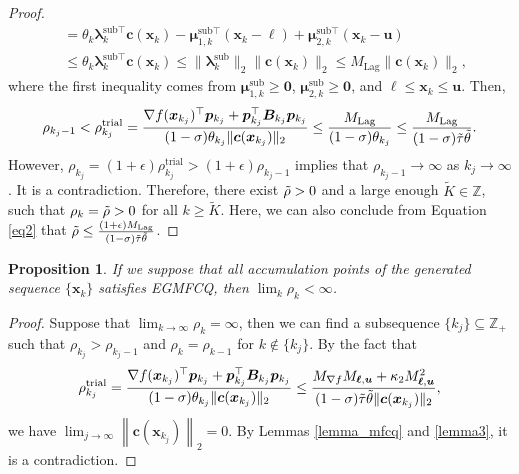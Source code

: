 \documentclass[aos]{imsart}
\numberwithin{equation}{section}
\theoremstyle{plain}
\newtheorem{proposition}{Proposition}
\begin{document}
\begin{appendix}
\begin{proof}
\begin{equation*}
\begin{split}
        & = \theta_k \bm{\lambda}_k^{\text{sub} \top} \bm{c}(\bm{x}_{k}) - \bm{\mu}_{1,k}^{\text{sub} \top}(\bm{x}_k  - \bm{\ell}) + \bm{\mu}_{2,k}^{\text{sub} \top}(\bm{x}_k  - \bm{u})\\
        & \leq \theta_k \bm{\lambda}_k^{\text{sub} \top} \bm{c}(\bm{x}_{k}) \leq \|\bm{\lambda}_k^{\text{sub}}\|_{2} \|\bm{c}(\bm{x}_{k})\|_2 \leq M_{\text{Lag}}\|\bm{c}(\bm{x}_{k})\|_2,
     \end{split}
     \end{equation*}
     where the first inequality comes from $\bm{\mu}_{1,k}^{\text{sub}} \geq \bm{0}$, $\bm{\mu}_{2,k}^{\text{sub}} \geq \bm{0}$, and $\bm{\ell} \leq \bm{x}_k \leq \bm{u}$. Then, 
     \begin{equation}
     \label{eq2}
         \rho_{k_j-1} < \rho_{k_j}^{\text{trial}} = \frac{\nabla f(\bm{x}_{k_j})^{\top} \bm{p}_{k_j} + \bm{p}_{k_j}^{\top} \bm{B}_{k_j} \bm{p}_{k_j}}{(1-\sigma)\theta_{k_j} \|\bm{c}(\bm{x}_{k_j})\|_2} \leq \frac{M_{\text{Lag}}}{(1-\sigma)\theta_{k_j}} \leq \frac{M_{\text{Lag}}}{(1-\sigma)\Tilde{\tau} \Tilde{\theta}}.
     \end{equation}
     However, $\rho_{k_j} = (1+\epsilon) \rho_{k_j}^{\text{trial}} > (1+\epsilon) \rho_{k_j-1}$ implies that $\rho_{k_j-1} \to \infty$ as $k_j \to \infty$. It is a contradiction. Therefore, there exist $\Tilde{\rho}>0$ and a large enough $\widetilde{K} \in \mathbb{Z}$, such that $\rho_k = \Tilde{\rho} > 0$ for all $k 
     \geq \widetilde{K}$. Here, we can also conclude from Equation \eqref{eq2} that  $\Tilde{\rho} \leq \frac{(1+\epsilon)M_{\text{Lag}}}{(1-\sigma)\Tilde{\tau} \Tilde{\theta}}$.  
 \end{proof}



\begin{proposition}
\label{prop_bound_penalty}
     If we suppose that all accumulation points of the generated sequence $\{\bm{x}_{k}\}$ satisfies EGMFCQ, then $\lim_{k} \rho_k < \infty$. 
 \end{proposition}

 \begin{proof}
     Suppose that $\lim_{k \to \infty} \rho_{k} = \infty$, then we can find a subsequence $\{k_j\} \subseteq \mathbb{Z}_{+}$ such that $\rho_{k_j} > \rho_{k_j - 1}$ and $\rho_k = \rho_{k-1}$ for $k \notin \{k_j\}$. By the fact that 
     \begin{equation*}
         \rho_{k_j}^{\text{trial}} = \frac{\nabla f(\bm{x}_{k_j})^{\top} \bm{p}_{k_j} + \bm{p}_{k_j}^{\top} \bm{B}_{k_j} \bm{p}_{k_j}}{(1-\sigma)\theta_{k_j} \|\bm{c}(\bm{x}_{k_j})\|_2} \leq \frac{M_{\nabla f} M_{\bm{\ell},\bm{u}} + \kappa_2 M_{\bm{\ell},\bm{u}}^2 }{(1-\sigma) \Tilde{\tau} \Tilde{\theta} \|\bm{c}(\bm{x}_{k_j})\|_2},
     \end{equation*}
     we have $\lim_{j \to \infty} \left\| \bm{c}(\bm{x}_{k_j}) \right\|_2 = 0$. By Lemmas \ref{lemma_mfcq} and \ref{lemma3}, it is a contradiction. 
 \end{proof}



\end{appendix}
\end{document}
